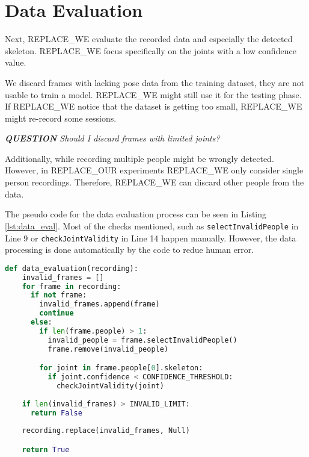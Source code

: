 \section{Data Evaluation}
\label{sec:data_evaluation}

Next, REPLACE_WE evaluate the recorded data and especially the detected skeleton. REPLACE_WE focus specifically on the joints with a low confidence value. 

We discard frames with lacking pose data from the training dataset, they are not usable to train a model. REPLACE_WE might still use it for the testing phase. If REPLACE_WE notice that the dataset is getting too small, REPLACE_WE might re-record some sessions.

\textit{\textbf{QUESTION} Should I discard frames with limited joints?}

Additionally, while recording multiple people might be wrongly detected. However, in REPLACE_OUR experiments REPLACE_WE only consider single person recordings. Therefore, REPLACE_WE can discard other people from the data.

The pseudo code for the data evaluation process can be seen in Listing \ref{lst:data_eval}. Most of the checks mentioned, such as \texttt{selectInvalidPeople} in Line 9 or \texttt{checkJointValidity} in Line 14 happen manually. However, the data processing is done automatically by the code to redue human error.

\begin{lstlisting}[language=python,
                    firstnumber=1,
                    caption={[Pseudo code for data evaluation]{Pseudo code for data evaluation}},
                    label={lst:data_eval}]
  def data_evaluation(recording):
    invalid_frames = []
    for frame in recording:
      if not frame:
        invalid_frames.append(frame)
        continue
      else:
        if len(frame.people) > 1:
          invalid_people = frame.selectInvalidPeople()
          frame.remove(invalid_people)

        for joint in frame.people[0].skeleton:
          if joint.confidence < CONFIDENCE_THRESHOLD:
            checkJointValidity(joint)
    
    if len(invalid_frames) > INVALID_LIMIT:
      return False
    
    recording.replace(invalid_frames, Null)

    return True
\end{lstlisting}
